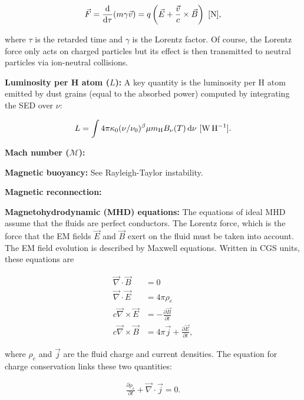 \documentclass[a4paper,10pt]{article}
\begin{document}
\begin{align*}
    \vec{F} = \dfrac{\mathrm{d}}{\mathrm{d}\tau} (m\gamma\vec{v}) = q\left(\vec{E} + \dfrac{\vec{v}}{c}\times\vec{B}\right) ~ [{\rm N}],
\end{align*}

{\noindent}where $\tau$ is the retarded time and $\gamma$ is the Lorentz factor. Of course, the Lorentz force only acts on charged particles but its effect is then transmitted to neutral particles via ion-neutral collisions.

{\noindent}\textbf{Luminosity per H atom ($L$):} A key quantity is the luminosity per H atom emitted by dust grains (equal to the absorbed power) computed by integrating the SED over $\nu$:

\begin{align*}
    L = \int 4\pi\kappa_0(\nu/\nu_0)^\beta \mu m_{\rm H}B_\nu(T) \,{\rm d}\nu ~ [{\rm W\,H^{-1}}].
\end{align*}

{\noindent}\textbf{Mach number ($\mathcal{M}$):}

{\noindent}\textbf{Magnetic buoyancy:} See Rayleigh-Taylor instability.

{\noindent}\textbf{Magnetic reconnection:}

{\noindent}\textbf{Magnetohydrodynamic (MHD) equations:} The equations of ideal MHD assume that the fluids are perfect conductors. The Lorentz force, which is the force that the EM fields $\vec{E}$ and $\vec{B}$ exert on the fluid must be taken into account. The EM field evolution is described by Maxwell equations. Written in CGS units, these equations are

\begin{align*}
    \vec\nabla\cdot\vec{B} &= 0 \\
    \vec\nabla\cdot\vec{E} &= 4\pi\rho_e \\
    c\vec\nabla\times\vec{E} &= - \frac{\partial\vec{B}}{\partial t} \\
    c\vec\nabla\times\vec{B} &= 4\pi\vec{j} + \frac{\partial\vec{E}}{\partial t},
\end{align*}

{\noindent}where $\rho_e$ and $\vec{j}$ are the fluid charge and current densities. The equation for charge conservation links these two quantities:

\begin{align*}
    \frac{\partial\rho_e}{\partial t} + \vec\nabla\cdot\vec{j} = 0.
\end{align*}
\end{document}
